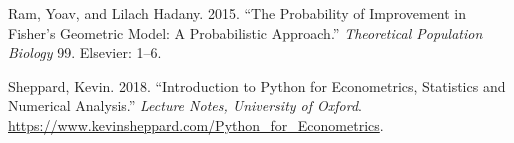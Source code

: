 \message{ !name(ccarroll_et_al_scipy_2018.tex)}\documentclass[10pt,twocolumn]{article}
\begin{document}
\hypertarget{ref-ram2015probability}{}
Ram, Yoav, and Lilach Hadany. 2015. ``The Probability of Improvement in
Fisher's Geometric Model: A Probabilistic Approach.'' \emph{Theoretical
Population Biology} 99. Elsevier: 1--6.

\hypertarget{ref-sheppard2018introduction}{}
Sheppard, Kevin. 2018. ``Introduction to Python for Econometrics,
Statistics and Numerical Analysis.'' \emph{Lecture Notes, University of
Oxford}. \url{https://www.kevinsheppard.com/Python_for_Econometrics}.
\end{document}
